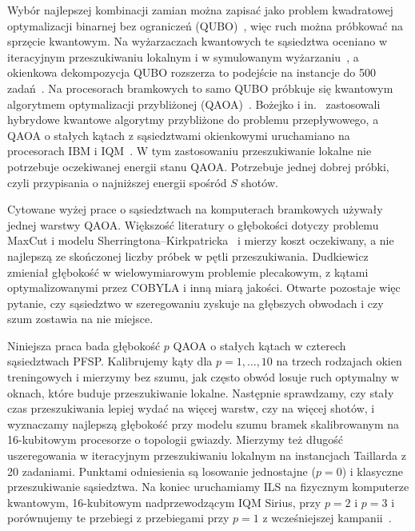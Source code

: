 \documentclass[runningheads]{llncs}
\begin{document}
Wybór najlepszej kombinacji zamian można zapisać jako problem kwadratowej
optymalizacji binarnej bez ograniczeń (QUBO)~\cite{lucas2014ising}, więc
ruch można próbkować na sprzęcie kwantowym. Na wyżarzaczach kwantowych te
sąsiedztwa oceniano w iteracyjnym przeszukiwaniu lokalnym i w symulowanym
wyżarzaniu~\cite{wojewodzki2026bpasts}, a okienkowa dekompozycja QUBO
rozszerza to podejście na instancje do 500 zadań~\cite{wojewodzki2026windowed}.
Na procesorach bramkowych to samo QUBO próbkuje się kwantowym algorytmem
optymalizacji przybliżonej (QAOA)~\cite{farhi2014qaoa}. Bożejko
i in.~\cite{bozejko2024cinti} zastosowali hybrydowe kwantowe algorytmy przybliżone do problemu przepływowego, a QAOA o stałych kątach
z sąsiedztwami okienkowymi uruchamiano na procesorach IBM
i IQM~\cite{wojewodzki2026gcmm,wojewodzki2026aciids}. W tym zastosowaniu
przeszukiwanie lokalne nie potrzebuje oczekiwanej energii stanu QAOA.
Potrzebuje jednej dobrej próbki, czyli przypisania o najniższej energii
spośród $S$ shotów.

Cytowane wyżej prace o sąsiedztwach na komputerach bramkowych używały
jednej warstwy QAOA. Większość literatury o głębokości dotyczy problemu
MaxCut i modelu Sherringtona--Kirkpatricka~\cite{zhou2020,basso2022,wurtz2021fixed}
i mierzy koszt oczekiwany, a nie najlepszą ze skończonej liczby próbek
w pętli przeszukiwania. Dudkiewicz~\cite{dudkiewicz2026depth} zmieniał
głębokość w wielowymiarowym problemie plecakowym, z kątami optymalizowanymi
przez COBYLA i inną miarą jakości. Otwarte pozostaje więc pytanie, czy
sąsiedztwo w szeregowaniu zyskuje na głębszych obwodach i czy szum zostawia
na nie miejsce.

Niniejsza praca bada głębokość $p$ QAOA o stałych kątach w czterech
sąsiedztwach PFSP. Kalibrujemy kąty dla $p = 1, \dots, 10$ na trzech
rodzajach okien treningowych i mierzymy bez szumu, jak często obwód losuje
ruch optymalny w oknach, które buduje przeszukiwanie lokalne. Następnie
sprawdzamy, czy stały czas przeszukiwania lepiej wydać na więcej warstw, czy
na więcej shotów, i wyznaczamy najlepszą głębokość przy modelu szumu bramek
skalibrowanym na 16-kubitowym procesorze o topologii gwiazdy. Mierzymy też długość uszeregowania w iteracyjnym przeszukiwaniu
lokalnym na instancjach Taillarda z 20 zadaniami. Punktami odniesienia są
losowanie jednostajne ($p = 0$) i klasyczne przeszukiwanie sąsiedztwa. Na
koniec uruchamiamy ILS na fizycznym komputerze kwantowym, 16-kubitowym
nadprzewodzącym IQM Sirius, przy $p = 2$ i $p = 3$
i porównujemy te przebiegi z przebiegami przy $p = 1$ z wcześniejszej
kampanii~\cite{wojewodzki2026aciids}.
\end{document}
